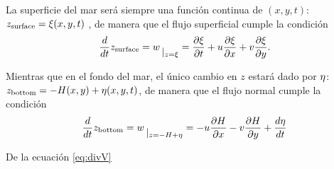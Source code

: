 \message{ !name(Tsunamis.tex)}\documentclass[TesisTotal.tex]{subfiles}
\begin{document}
La superficie del mar será siempre una función continua de $(x,y,t)$: $z_{\operatorname{surface}} = \xi(x,y,t)$
, de manera que el flujo superficial cumple la condición
\begin{equation}
  \label{eq:freeSurfaceFlow}
  \ddt{}z_{\surface} = w \rvert{z=\sup} = \pddt{\sup} + u \pddx{\sup} + v \pddy{\sup}.
\end{equation}

Mientras que en el fondo del mar, el único cambio en $z$ estará dado por $\eta$: $z_{\operatorname{bottom}} = -H(x,y) + \eta(x,y,t)$, de manera que el flujo normal cumple la condición
\begin{equation}
  \label{eq:normalFlow}
    \ddt{}z_{\bottom} = w \rvert{z=-\down + \bup} = -u \pddx{\down} - v \pddy{\down} + \ddt{\bup}
\end{equation}

De la ecuación \ref{eq:divV}
\end{document}
